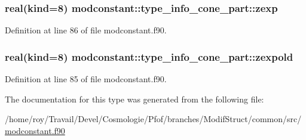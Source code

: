 \hypertarget{structmodconstant_1_1type__info__cone__part_a0fcdc6b7c3ad1553a7ab4e7d839d82ed}{
\subsubsection[{zexp}]{\setlength{\rightskip}{0pt plus 5cm}real(kind=8) modconstant\-::type\-\_\-info\-\_\-cone\-\_\-part\-::zexp}}\label{structmodconstant_1_1type__info__cone__part_a0fcdc6b7c3ad1553a7ab4e7d839d82ed}


Definition at line 86 of file modconstant.\-f90.

\hypertarget{structmodconstant_1_1type__info__cone__part_a44164e6a95ebcda4cc1ded30ba9b1bd5}{
\subsubsection[{zexpold}]{\setlength{\rightskip}{0pt plus 5cm}real(kind=8) modconstant\-::type\-\_\-info\-\_\-cone\-\_\-part\-::zexpold}}\label{structmodconstant_1_1type__info__cone__part_a44164e6a95ebcda4cc1ded30ba9b1bd5}


Definition at line 85 of file modconstant.\-f90.



The documentation for this type was generated from the following file\-:\begin{DoxyCompactItemize}
\item 
/home/roy/\-Travail/\-Devel/\-Cosmologie/\-Pfof/branches/\-Modif\-Struct/common/src/\hyperlink{modconstant_8f90}{modconstant.\-f90}\end{DoxyCompactItemize}
